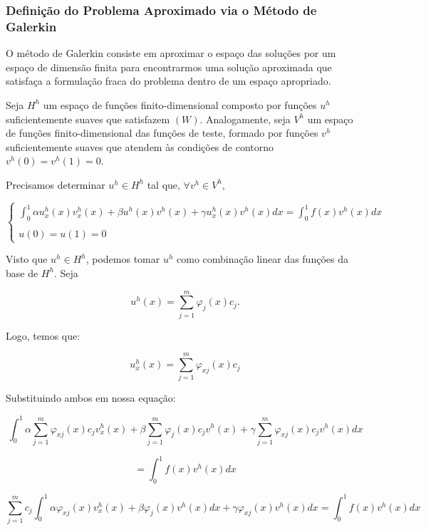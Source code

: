 \begin{frame}
  \frametitle{Definição do Problema Aproximado via o Método de Galerkin}

  O método de Galerkin consiste em aproximar o espaço das soluções por um espaço de dimensão finita para encontrarmos uma solução aproximada que satisfaça a formulação fraca do problema dentro de um espaço apropriado.
  \vspace{0.3cm}

  Seja $H^h$ um espaço de funções finito-dimensional composto por funções $u^h$ suficientemente suaves que satisfazem $(W)$. Analogamente, seja $V^h$ um espaço de funções finito-dimensional das funções de teste, formado por funções $v^h$ suficientemente suaves que atendem às condições de contorno $v^h(0) = v^h(1) = 0$.

  Precisamos determinar $u^h \in H^h$ tal que, $\forall v^h \in V^h$,

  \[\begin{cases} \displaystyle\int^{1}_{0} \alpha u^{h}_{x}(x)v^{h}_{x}(x) + \beta  u^{h}(x)v^{h}(x) + \gamma  u^{h}_{x}(x)v^{h}(x) dx = \int^{1}_{0} f(x)v^{h}(x) dx \\
    \\
    u(0) = u(1) = 0
  \end{cases}\]
\end{frame}

\begin{frame}
  Visto que $u^h \in H^h$, podemos tomar $u^h$ como combinação linear das funções da base de $H^h$. Seja

  \[u^h(x) = \sum_{j=1}^{m} \varphi_j(x) c_j.\]

  Logo, temos que:

  \[u_{x}^h(x) = \sum_{j=1}^{m} \varphi_{xj}(x)c_j\]

  Substituindo ambos em nossa equação:

  \vspace{0.3cm}

  \[\int_{0}^{1} \alpha \sum_{j=1}^{m} \varphi_{xj}(x) c_j v^h_x(x) + \beta \sum_{j=1}^{m} \varphi_j(x)c_j v^h(x) + \gamma \sum_{j=1}^{m} \varphi_{xj}(x)c_j v^h(x)dx\]

  \[= \int_{0}^{1} f(x) v^h(x)dx\]
\end{frame}

\begin{frame}
  \vspace{1cm}
  \[\sum_{j=1}^{m} c_j \int_{0}^{1} \alpha \varphi_{xj}(x)  v^h_x(x) + \beta \varphi_j(x) v^h(x)dx + \gamma  \varphi_{xj}(x) v^h(x)dx = \int_{0}^{1} f(x) v^h(x)dx\]
\end{frame}

